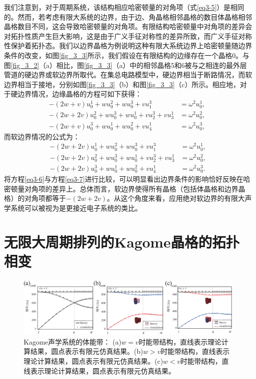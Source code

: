 我们注意到，对于周期系统，该结构相应哈密顿量的对角项（式\ref{eq3-5}）是相同的。然而，若考虑有限大系统的边界，由于边、角晶格相邻晶格的数目体晶格相邻晶格数目不同，这会导致哈密顿量的对角项。有限结构哈密顿量中对角项的差异会对拓扑性质产生巨大影响，这是由于广义手征对称性的差异所致，而广义手征对称性保护着拓扑态。我们以边界晶格为例说明这种有限大系统边界上哈密顿量随边界条件的改变，如图\ref{fig_3_3}所示，我们假设在有限结构的边缘存在一个晶格0。与图\ref{fig_3_2}（a）相比，图\ref{fig_3_3}（a）中的相邻晶格5和6被与之相连的最外层管道的硬边界或软边界所取代。在集总电路模型中，硬边界相当于断路情况，而软边界相当于接地，分别如图\ref{fig_3_3}（b）和图\ref{fig_3_3}（c）所示。相应地，对于硬边界情况，边缘晶格的方程可如下获得：
\begin{subequations}\label{eq3-6}
  \begin{align}
  -(2w + v)u_{0}^{1} + wu_{0}^{2} + wu_{0}^{3} + vu_{1}^{3} &= \omega^{2}u_{0}^{1}, \\
  -(2w + 2v)u_{0}^{2} + wu_{0}^{3} + wu_{0}^{1} + vu_{2}^{3} + vu_{3}^{1} &= \omega^{2}u_{0}^{2}, \\
  -(2w + v)u_{0}^{3} + wu_{0}^{1} + wu_{0}^{2} + vu_{4}^{1} &= \omega^{2}u_{0}^{3}, \
  \end{align}
\end{subequations}
而软边界情况的公式为：
\begin{subequations}\label{eq3-7}
  \begin{align}
  -(2w + 2v)u_{0}^{1} + wu_{0}^{2} + wu_{0}^{3} + vu_{1}^{3} &= \omega^{2}u_{0}^{1}, \\
  -(2w + 2v)u_{0}^{2} + wu_{0}^{3} + wu_{0}^{1} + vu_{2}^{3} + vu_{3}^{1} &= \omega^{2}u_{0}^{2}, \\
  -(2w + 2v)u_{0}^{3} + wu_{0}^{1} + wu_{0}^{2} + vu_{4}^{1} &= \omega^{2}u_{0}^{3}. 
  \end{align}
\end{subequations}
将方程\ref{eq3-6}与方程\ref{eq3-7}进行比较，可以明显看出边界条件的影响恰好反映在哈密顿量对角项的差异上。总体而言，软边界使得所有晶格（包括体晶格和边界晶格）的对角项都等于$-(2w + 2v)$。从这个角度来看，应用绝对软边界的有限大声学系统可以被视为是更接近电子系统的类比。

\section{无限大周期排列的Kagome晶格的拓扑相变}

\begin{figure}[h!]
  \centering
  \includegraphics[width=1\textwidth]{images/fig3-4.eps} 
  \caption{Kagome声学系统的体能带：
  (a)$w=v$时能带结构，直线表示理论计算结果，圆点表示有限元仿真结果。(b)$w>v$时能带结构，直线表示理论计算结果，圆点表示有限元仿真结果。(c)$w<v$时能带结构，直线表示理论计算结果，圆点表示有限元仿真结果。
  }
  \label{fig_3_4}
\end{figure}


